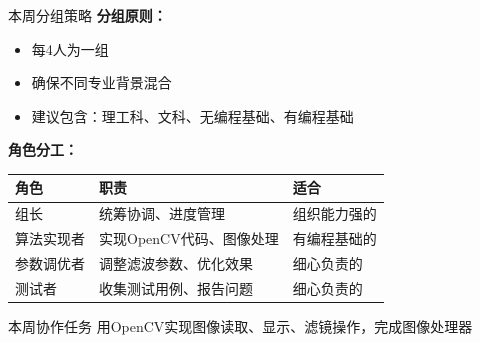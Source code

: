 \documentclass[aspectratio=169, 12pt]{beamer}
\begin{document}
\begin{frame}{本周分组策略}
    \textbf{分组原则：}
    \begin{itemize}
        \item 每4人为一组
        \item 确保不同专业背景混合
        \item 建议包含：理工科、文科、无编程基础、有编程基础
    \end{itemize}

    \vspace{0.3cm}

    \textbf{角色分工：}
    \begin{table}
        \centering
        \small
        \begin{tabular}{lp{6cm}l}
            \toprule
            \textbf{角色} & \textbf{职责} & \textbf{适合} \\
            \midrule
            组长 & 统筹协调、进度管理 & 组织能力强的 \\
            算法实现者 & 实现OpenCV代码、图像处理 & 有编程基础的 \\
            参数调优者 & 调整滤波参数、优化效果 & 细心负责的 \\
            测试者 & 收集测试用例、报告问题 & 细心负责的 \\
            \bottomrule
        \end{tabular}
    \end{table}

    \vspace{0.3cm}

    \begin{block}{本周协作任务}
        用OpenCV实现图像读取、显示、滤镜操作，完成图像处理器
    \end{block}
\end{frame}
\end{document}
